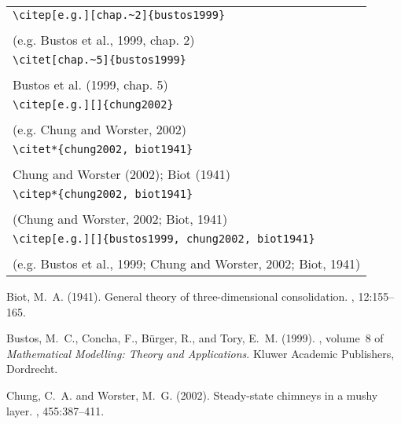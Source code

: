 \documentclass{article}
\begin{document}
\begin{center}
\begin{tabular}{l}
\verb#\citep[e.g.][chap.~2]{bustos1999}#\\
\citep[e.g.][chap.~2]{bustos1999} \\
(e.g. Bustos et al., 1999, chap. 2)\\
\hline
\verb#\citet[chap.~5]{bustos1999}#\\
\citet[chap.~5]{bustos1999}\\
Bustos et al. (1999, chap. 5)\\
\hline
\verb#\citep[e.g.][]{chung2002}#\\
\citep[e.g.][]{chung2002} \\
(e.g. Chung and Worster, 2002)\\
\hline
\verb#\citet*{chung2002, biot1941}#\\
\citet*{chung2002, biot1941}\\
Chung and Worster (2002); Biot (1941)\\
\hline
\verb#\citep*{chung2002, biot1941}#\\
\citep*{chung2002, biot1941}\\
(Chung and Worster, 2002; Biot, 1941)\\
\hline
\verb#\citep[e.g.][]{bustos1999, chung2002, biot1941}#\\
\citep[e.g.][]{bustos1999, chung2002, biot1941} \\
(e.g. Bustos et al., 1999; Chung and Worster, 2002; Biot, 1941)\\

\end{tabular}
\end{center}

%

\begin{thebibliography}{}

Biot, M.~A. (1941).
\newblock General theory of three-dimensional consolidation.
, 12:155--165.

Bustos, M.~C., Concha, F., B\"{u}rger, R., and Tory, E.~M. (1999).
, volume~8 of {\em Mathematical Modelling: Theory and
  Applications}.
\newblock Kluwer Academic Publishers, Dordrecht.

Chung, C.~A. and Worster, M.~G. (2002).
\newblock Steady-state chimneys in a mushy layer.
, 455:387--411.

\end{thebibliography}
\end{document}
